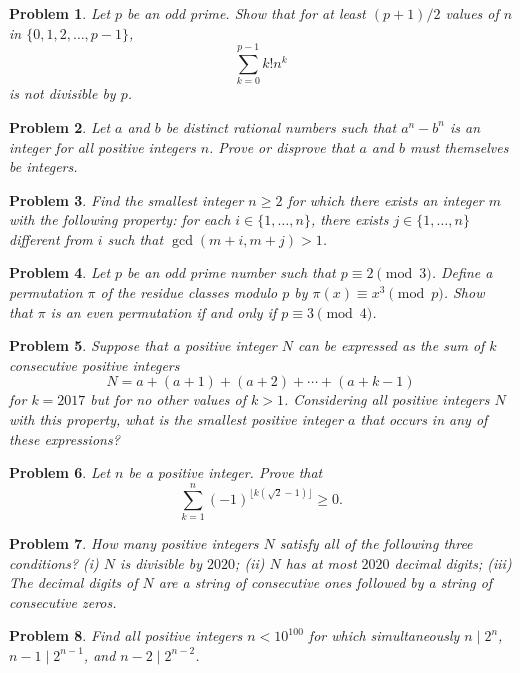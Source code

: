 \documentclass[12pt]{article}
\newtheorem{problem}{Problem}
\begin{document}
\begin{problem}
Let $p$ be an odd prime. Show that for at least $(p+1)/2$ values of $n$ in $\{0, 1, 2, \ldots, p-1\}$,
\[
\sum_{k=0}^{p-1} k! n^k
\]
is not divisible by $p$.
\end{problem}

\begin{problem}
Let $a$ and $b$ be distinct rational numbers such that $a^n - b^n$ is an integer for all positive integers $n$. Prove or disprove that $a$ and $b$ must themselves be integers.
\end{problem}

\begin{problem}
Find the smallest integer $n \geq 2$ for which there exists an integer $m$ with the following property: for each $i \in \{1, \ldots, n\}$, there exists $j \in \{1, \ldots, n\}$ different from $i$ such that $\gcd(m + i, m + j) > 1$.
\end{problem}

\begin{problem}
Let $p$ be an odd prime number such that $p \equiv 2 \pmod 3$. Define a permutation $\pi$ of the residue classes modulo $p$ by $\pi(x) \equiv x^3 \pmod p$. Show that $\pi$ is an even permutation if and only if $p \equiv 3 \pmod 4$.
\end{problem}

\begin{problem}
Suppose that a positive integer $N$ can be expressed as the sum of $k$ consecutive positive integers
\[
N = a + (a+1) + (a+2) + \cdots + (a + k - 1)
\]
for $k = 2017$ but for no other values of $k > 1$. Considering all positive integers $N$ with this property, what is the smallest positive integer $a$ that occurs in any of these expressions?
\end{problem}

\begin{problem}
Let $n$ be a positive integer. Prove that
\[
\sum_{k = 1}^n (-1)^{\lfloor k(\sqrt{2} - 1) \rfloor} \geq 0.
\]
\end{problem}

\begin{problem}
How many positive integers $N$ satisfy all of the following three conditions? (i) $N$ is divisible by $2020$; (ii) $N$ has at most $2020$ decimal digits; (iii) The decimal digits of $N$ are a string of consecutive ones followed by a string of consecutive zeros.
\end{problem}

\begin{problem}
Find all positive integers $n < 10^{100}$ for which simultaneously $n \mid 2^n$, $n-1 \mid 2^{n-1}$, and $n-2 \mid 2^{n-2}$.
\end{problem}
\end{document}

